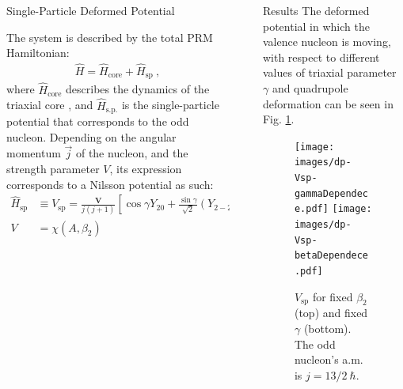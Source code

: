 \documentclass[final]{beamer}
\newlength{\sepwidth}
\newlength{\colwidth}
\newcommand{\separatorcolumn}{\begin{column}{\sepwidth}\end{column}}
\begin{document}
\begin{frame}[t]
\begin{columns}[t]
\begin{column}{\colwidth}
  \begin{block}{Single-Particle Deformed Potential}

The system is described by the total PRM Hamiltonian:
\begin{align}
    \hat{H}=\hat{H}_\text{core}+\hat{H}_\text{sp}\ ,
\end{align}
where $\hat{H}_\text{core}$ describes the dynamics of the triaxial core \cite{raduta2020new}, and $\hat{H}_\text{s.p.}$ is the single-particle potential that corresponds to the odd nucleon. Depending on the angular momentum $\vec{j}$ of the nucleon, and the strength parameter $V$, its expression corresponds to a Nilsson potential \cite{nilsson1955mat} as such:
\begin{align}
\hat{H}_\text{sp}&\equiv V_\text{sp}=\frac{\mathbf{V}}{j(j+1)}\left[\cos\gamma Y_{20}+\frac{\sin\gamma}{\sqrt{2}}\left(Y_{2-2}+Y_{22}\right)\right],\\
V&=\chi(A,\beta_2)
\end{align}


  \end{block}
  
\end{column}

\separatorcolumn

\begin{column}{\colwidth}


  \begin{block}{Results}
  The deformed potential in which the valence nucleon is moving, with respect to different values of triaxial parameter $\gamma$ and quadrupole deformation can be seen in Fig. \ref{gamma-beta-dev-v}.
 \begin{figure}
     \centering
     \texttt{[image: images/dp-Vsp-gammaDependece.pdf]}
     \texttt{[image: images/dp-Vsp-betaDependece.pdf]}
     \caption{$V_\text{sp}$ for fixed $\beta_2$ (top) and fixed $\gamma$ (bottom). The odd nucleon's a.m. is $j=13/2\ \hbar$.}
     \label{gamma-beta-dev-v}
 \end{figure}
  \end{block}
  

\end{column}
\end{columns}
\end{frame}
\end{document}
